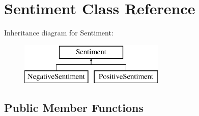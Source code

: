 \hypertarget{classSentiment}{\section{Sentiment Class Reference}
\label{classSentiment}
}
Inheritance diagram for Sentiment\-:\begin{figure}[H]
\begin{center}
\leavevmode
\includegraphics[height=2.000000cm]{classSentiment}
\end{center}
\end{figure}
\subsection*{Public Member Functions}
